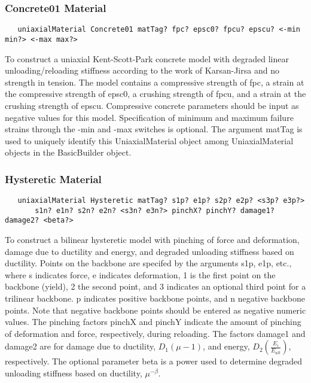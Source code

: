 \documentclass[12pt]{article}
\begin{document}
\subsubsection{Concrete01 Material}
{\sf\small
\begin{verbatim}
   uniaxialMaterial Concrete01 matTag? fpc? epsc0? fpcu? epscu? <-min min?> <-max max?>
\end{verbatim}
}

\noindent To construct a uniaxial Kent-Scott-Park concrete model with degraded 
linear unloading/reloading stiffness according to the work of Karsan-Jirsa and no
strength in tension. The model contains a compressive strength of fpc,
a strain at the compressive strength of epsc0, a crushing strength of
fpcu, and a strain at the crushing strength of epscu. Compressive
concrete parameters should be input as negative values for
this model. Specification of minimum and maximum
failure strains through the -min and -max switches is optional. The argument 
matTag is used to uniquely identify this UniaxialMaterial object among 
UniaxialMaterial objects in the BasicBuilder object.

\subsubsection{Hysteretic Material}
{\sf\small
\begin{verbatim}
   uniaxialMaterial Hysteretic matTag? s1p? e1p? s2p? e2p? <s3p? e3p?>
       s1n? e1n? s2n? e2n? <s3n? e3n?> pinchX? pinchY? damage1? damage2? <beta?>
\end{verbatim}
}

\noindent To construct a bilinear hysteretic model with pinching of force and
deformation, damage due to ductility and energy, and degraded unloading 
stiffness based on ductility. Points on the backbone are specifed by the
arguments s1p, e1p, etc., where s indicates force, e indicates deformation,
1 is the first point on the backbone (yield), 2 the second point, and 3 indicates
an optional third point for a trilinear backbone. p indicates positive backbone
points, and n negative backbone points. Note that negative backbone points
should be entered as negative numeric values. The pinching factors pinchX and
pinchY indicate the amount of pinching of deformation and force, respectively,
during reloading. The factors damage1 and damage2 are for damage due 
to ductility, $D_1(\mu-1)$, and energy, $D_2(\frac{E_i}{E_{ult}})$, respectively. 
The optional parameter beta is a power used to determine degraded
unloading stiffness based on ductility, $\mu^{-\beta}$.
\end{document}
